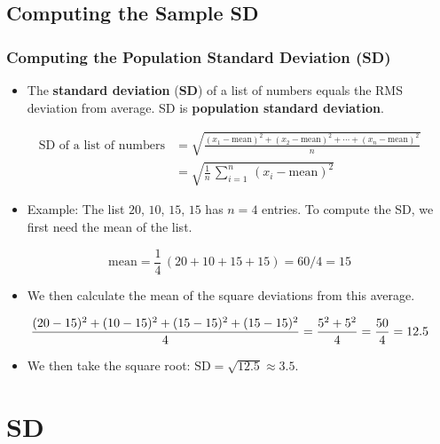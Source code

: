 \documentclass[t]{beamer}
\begin{document}
\subsection{Computing the Sample SD}
\begin{frame}[t]\frametitle{Computing the Population Standard Deviation (SD)}
{\small
\begin{itemize}
\item The \textbf{standard deviation} (\textbf{SD}) 
  of a list of numbers equals the RMS deviation from average. SD is
  \textbf{population standard deviation}.\vspace{-9pt}
\end{itemize}
{\footnotesize
\begin{align*}
\mbox{SD of a list of numbers} &= \sqrt{\frac{(x_1-\mbox{mean})^2+(x_2-\mbox{mean})^2+\cdots + (x_n-\mbox{mean})^2}{n}}\\
                               &=\sqrt{\frac{1}{n}\,\sum_{i=1}^n\,(x_i-\mbox{mean})^2}
\end{align*}}\vspace{-12pt}
\begin{itemize}
\item Example:  The list $20$, $10$, $15$, $15$ has $n=4$ entries.  
To compute the SD, we first need the mean of the list.
\end{itemize}
{\footnotesize\[\mbox{mean}=\frac{1}{4}\,(20+10+15+15) = 60/4 = 15\]}\vspace{-15pt}
\begin{itemize}
\item[] We then calculate the mean of the square deviations from this average.
\end{itemize}\vspace{2pt}
{\footnotesize
\[\frac{(20-15)^2 + (10-15)^2 + (15-15)^2 + (15-15)^2}{4}=\frac{5^2 + 5^2}{4}=\frac{50}{4}=12.5\vspace{-8pt}\]}
\begin{itemize}
\item[] We then take the square root:  $\mbox{SD}=\sqrt{12.5}\approx 3.5$.
\end{itemize}
}
\end{frame}

\section{SD}
\end{document}
